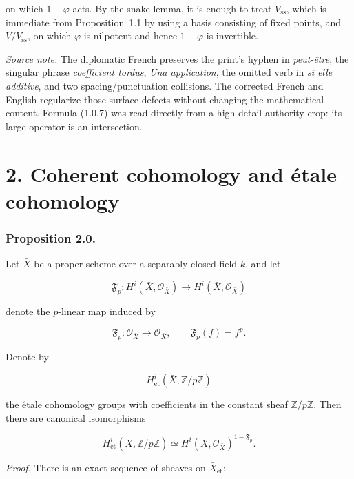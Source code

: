 on which $1-\varphi$ acts. By the snake lemma, it is enough to treat
$V_{\mathrm{ss}}$, which is immediate from Proposition~1.1 by using a basis
consisting of fixed points, and $V/V_{\mathrm{ss}}$, on which $\varphi$ is
nilpotent and hence $1-\varphi$ is invertible.

\medskip
\noindent\emph{Source note.}
The diplomatic French preserves the print's hyphen in \emph{peut-être}, the
singular phrase \emph{coefficient tordus}, \emph{Una application}, the
omitted verb in \emph{si elle additive}, and two spacing/punctuation
collisions. The corrected French and English regularize those surface defects
without changing the mathematical content. Formula (1.0.7) was read directly
from a high-detail authority crop: its large operator is an intersection.

\section*{2. Coherent cohomology and étale cohomology}

\subsubsection*{Proposition 2.0.}
Let $\bar X$ be a proper scheme over a separably closed field $k$, and let

\begin{equation}\tag{2.0.1}
\mathfrak F_p:H^i(\bar X,\mathcal O_{\bar X})
\longrightarrow H^i(\bar X,\mathcal O_{\bar X})
\end{equation}

denote the $p$-linear map induced by

\begin{equation}\tag{2.0.2}
\mathfrak F_p:\mathcal O_{\bar X}\longrightarrow\mathcal O_{\bar X},
\qquad \mathfrak F_p(f)=f^p.
\end{equation}

Denote by

\[
H^i_{\mathrm{et}}(\bar X,\mathbb Z/p\mathbb Z)
\]

the étale cohomology groups with coefficients in the constant sheaf
$\mathbb Z/p\mathbb Z$. Then there are canonical isomorphisms

\begin{equation}\tag{2.0.3}
H^i_{\mathrm{et}}(\bar X,\mathbb Z/p\mathbb Z)
\simeq
H^i(\bar X,\mathcal O_{\bar X})^{1-\mathfrak F_p}.
\end{equation}

\medskip
\noindent\emph{Proof.}
There is an exact sequence of sheaves on $\bar X_{\mathrm{et}}$:

